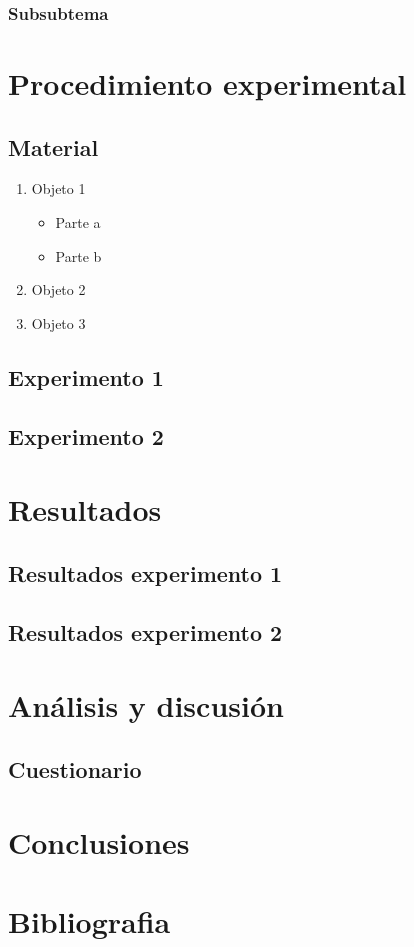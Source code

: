 \documentclass[letterpaper]{article}
\begin{document}
\subsubsection{Subsubtema }

\section{Procedimiento experimental}

\subsection{Material}

\begin{enumerate}
    \item Objeto 1
    \begin{itemize}
        \item Parte a
        \item Parte b
    \end{itemize}
    \item Objeto 2
    \item Objeto 3
\end{enumerate}

\subsection{Experimento 1}

\subsection{Experimento 2}

\section{Resultados}

\subsection{Resultados experimento 1}

\subsection{Resultados experimento 2}

\section{Análisis y discusión}

\subsection{Cuestionario}

\section{Conclusiones}

\section{Bibliografia}
\end{document}
